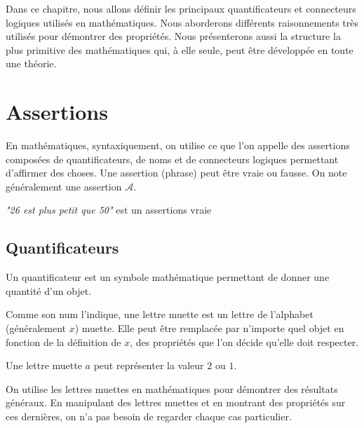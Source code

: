 
Dans ce chapitre, nous allons définir les principaux quantificateurs et connecteurs logiques utilisés en mathématiques. 
Nous aborderons différents raisonnements très utilisés pour démontrer des propriétés. 
Nous présenterons aussi la structure la plus primitive des mathématiques qui, à elle seule, peut être développée en 
toute une théorie. 


\section{Assertions}

En mathématiques, syntaxiquement, on utilise ce que l'on appelle des assertions composées de quantificateurs, de noms 
et de connecteurs logiques permettant d'affirmer des choses. Une assertion (phrase) peut être vraie ou fausse. 
On note généralement une assertion $\mathcal{A}$. 

\begin{example}
    \emph{"26 est plus petit que 50"} est un assertions vraie 
\end{example}

\subsection{Quantificateurs}

Un quantificateur est un symbole mathématique permettant de donner une quantité d'un objet. 

\begin{definition}
    Comme son num l'indique, une lettre muette est un lettre de l'alphabet (généralement $x$) muette. 
    Elle peut être remplacée par n'importe quel objet en fonction de la définition de $x$, des propriétés 
    que l'on décide qu'elle doit respecter. 
\end{definition}

\begin{example}
    Une lettre muette $a$ peut représenter la valeur $2$ ou $1$. 
\end{example}

On utilise les lettres muettes en mathématiques pour démontrer des résultats généraux. 
En manipulant des lettres muettes et en montrant des propriétés sur ces dernières, on n'a pas besoin de regarder chaque 
cas particulier. 

